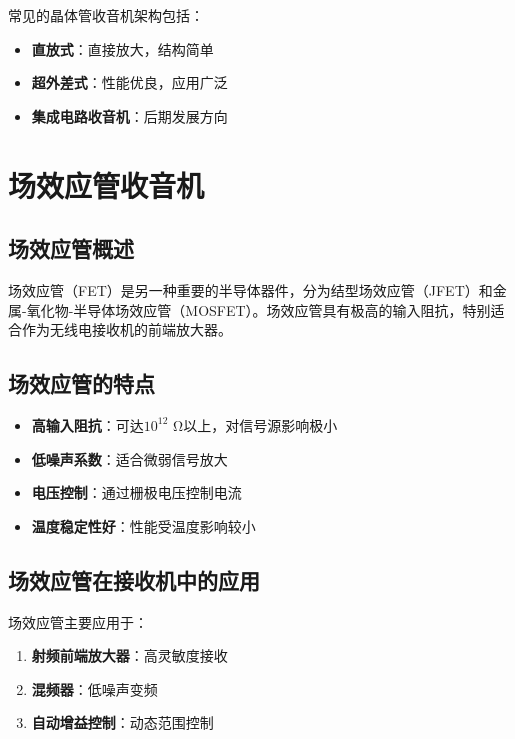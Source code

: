 常见的晶体管收音机架构包括：

\begin{itemize}
    \item \textbf{直放式}：直接放大，结构简单
    \item \textbf{超外差式}：性能优良，应用广泛
    \item \textbf{集成电路收音机}：后期发展方向
\end{itemize}

\section{场效应管收音机}
\label{sec:fet_radio}

\subsection{场效应管概述}
\label{sec:fet_intro}

场效应管（FET）是另一种重要的半导体器件，分为结型场效应管（JFET）和金属-氧化物-半导体场效应管（MOSFET）。场效应管具有极高的输入阻抗，特别适合作为无线电接收机的前端放大器。

\subsection{场效应管的特点}
\label{sec:fet_features}

\begin{itemize}
    \item \textbf{高输入阻抗}：可达$10^{12}$ Ω以上，对信号源影响极小
    \item \textbf{低噪声系数}：适合微弱信号放大
    \item \textbf{电压控制}：通过栅极电压控制电流
    \item \textbf{温度稳定性好}：性能受温度影响较小
\end{itemize}

\subsection{场效应管在接收机中的应用}
\label{sec:fet_applications}

场效应管主要应用于：

\begin{enumerate}
    \item \textbf{射频前端放大器}：高灵敏度接收
    \item \textbf{混频器}：低噪声变频
    \item \textbf{自动增益控制}：动态范围控制
\end{enumerate}


